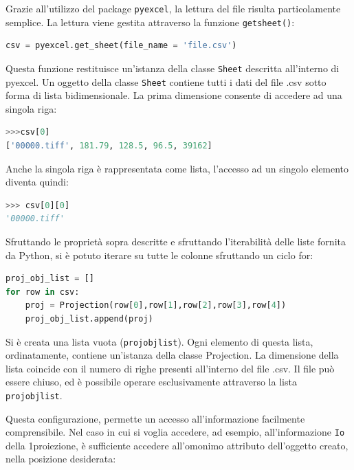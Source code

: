 \documentclass[a4paper,11pt, oneside]{article}
\begin{document}
            Grazie all'utilizzo del package \texttt{pyexcel}, la lettura del file risulta particolamente semplice.
            La lettura viene gestita attraverso la funzione \texttt{get\textunderscore sheet()}:
            
            \begin{lstlisting}[language=python, frame=bt]
csv = pyexcel.get_sheet(file_name = 'file.csv')
            \end{lstlisting}
            
            Questa funzione restituisce un'istanza della classe \texttt{Sheet} descritta all'interno di pyexcel.
            Un oggetto della classe \texttt{Sheet} contiene tutti i dati del file .csv sotto forma di lista bidimensionale.\cite{pyexcel-docs} La prima dimensione consente di accedere ad una singola riga:
            
            \begin{lstlisting}[language=python, frame=bt]
>>>csv[0]
['00000.tiff', 181.79, 128.5, 96.5, 39162]
            \end{lstlisting}
            
            Anche la singola riga è rappresentata come lista, l'accesso ad un singolo elemento diventa quindi:
            \begin{lstlisting}[language=python, frame=bt]
>>> csv[0][0]
'00000.tiff'
            \end{lstlisting}
            
            
            Sfruttando le proprietà sopra descritte e sfruttando l'iterabilità delle liste fornita da Python\cite{python-list}, si è potuto iterare su tutte le colonne sfruttando un ciclo for:
            
            \begin{lstlisting}[language=python, frame=bt]
proj_obj_list = []
for row in csv:
    proj = Projection(row[0],row[1],row[2],row[3],row[4])
    proj_obj_list.append(proj)
            \end{lstlisting}
            
            Si è creata una lista vuota (\texttt{proj\textunderscore obj\textunderscore list}). Ogni elemento di questa lista, ordinatamente, contiene un'istanza della classe Projection. La dimensione della lista coincide con il numero di righe presenti all'interno del file .csv. Il file può essere chiuso, ed è possibile operare esclusivamente attraverso la lista \texttt{proj\textunderscore obj\textunderscore list}.
            \bigskip
            \par
            Questa configurazione, permette un accesso all'informazione facilmente comprensibile. Nel caso in cui si voglia accedere, ad esempio,  all'informazione \texttt{Io} della 1\degree proiezione, è sufficiente accedere all'omonimo attributo dell'oggetto creato, nella posizione desiderata: 
            
\end{document}
